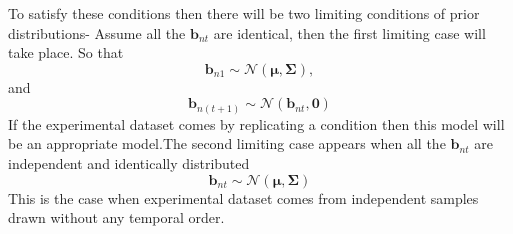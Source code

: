 To satisfy these conditions then there will be two limiting conditions of prior distributions- Assume all the $\textbf{b}_{nt}$ are identical, then the first limiting case will take place. So that
\begin{equation} \label{eq:limit_one_a}
   \textbf{b}_{n1} \sim \mathcal{N} ( \boldsymbol{\mu},\boldsymbol{\Sigma}), 
\end{equation}
and
\begin{equation} \label{eq:limit_one_b}
   \textbf{b}_{n(t+1)} \sim \mathcal{N} ( \textbf{b}_{nt},\textbf{0})
\end{equation}
If the experimental dataset comes by replicating a condition then this model will be an appropriate model.The second limiting case appears when all the $\textbf{b}_{nt}$ are independent and identically distributed
\begin{equation} \label{eq:limit_two}
   \textbf{b}_{nt}\sim \mathcal{N} ( \boldsymbol{\mu},\boldsymbol{\Sigma})
\end{equation}
This is the case when experimental dataset comes from independent samples drawn without any temporal order.

